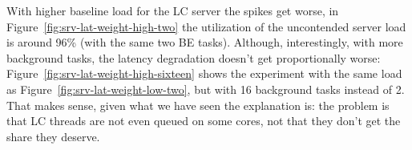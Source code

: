 With higher baseline load for the LC server the spikes get worse, in
Figure~\ref{fig:srv-lat-weight-high-two} the utilization of the uncontended server load is around 96\%
(with the same two BE tasks). Although, interestingly, with more background
tasks, the latency degradation doesn't get proportionally worse:
Figure~\ref{fig:srv-lat-weight-high-sixteen} shows the experiment with the same load as
Figure~\ref{fig:srv-lat-weight-low-two}, but with 16 background tasks instead of 2. That
makes sense, given what we have seen the explanation is: the problem is that LC
threads are not even queued on some cores, not that they don't get the share
they deserve.







